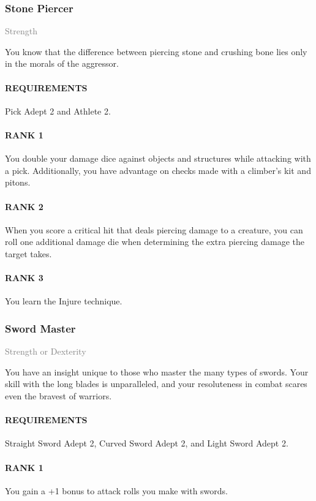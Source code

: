\subsubsection{Stone Piercer} \label{feat::stonepiercer}
\small{\textcolor{gray}{Strength}}

\normalsize
You know that the difference between piercing stone and crushing bone lies only in the morals of the aggressor.
\paragraph{REQUIREMENTS} Pick Adept 2 and Athlete 2.
\paragraph{RANK 1} You double your damage dice against objects and structures while attacking with a pick.
Additionally, you have advantage on checks made with a climber's kit and pitons.
\paragraph{RANK 2} When you score a critical hit that deals piercing damage to a creature, you can roll one additional damage die when determining the extra piercing damage the target takes.
\paragraph{RANK 3} You learn the Injure technique.

\subsubsection{Sword Master} \label{feat::swordmaster}
\small{\textcolor{gray}{Strength or Dexterity}}

\normalsize
You have an insight unique to those who master the many types of swords.
Your skill with the long blades is unparalleled, and your resoluteness in combat scares even the bravest of warriors.
\paragraph{REQUIREMENTS} Straight Sword Adept 2, Curved Sword Adept 2, and Light Sword Adept 2.
\paragraph{RANK 1} You gain a +1 bonus to attack rolls you make with swords.

